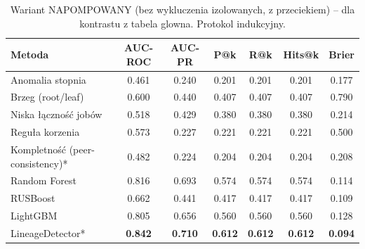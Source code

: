 \begin{table}[ht]
\centering
\caption{Wariant NAPOMPOWANY (bez wykluczenia izolowanych, z przeciekiem) -- dla kontrastu z tabela glowna. Protokol indukcyjny.}
\label{tab:wyniki-napompowany}
\begin{tabular}{lcccccc}
\toprule
\textbf{Metoda} & \textbf{AUC-ROC} & \textbf{AUC-PR} & \textbf{P@k} & \textbf{R@k} & \textbf{Hits@k} & \textbf{Brier} \\
\midrule
Anomalia stopnia & 0.461 & 0.240 & 0.201 & 0.201 & 0.201 & 0.177 \\
Brzeg (root/leaf) & 0.600 & 0.440 & 0.407 & 0.407 & 0.407 & 0.790 \\
Niska łączność jobów & 0.518 & 0.429 & 0.380 & 0.380 & 0.380 & 0.214 \\
Reguła korzenia & 0.573 & 0.227 & 0.221 & 0.221 & 0.221 & 0.500 \\
Kompletność (peer-consistency)* & 0.482 & 0.224 & 0.204 & 0.204 & 0.204 & 0.208 \\
\midrule
Random Forest & 0.816 & 0.693 & 0.574 & 0.574 & 0.574 & 0.114 \\
RUSBoost & 0.662 & 0.441 & 0.417 & 0.417 & 0.417 & 0.109 \\
LightGBM & 0.805 & 0.656 & 0.560 & 0.560 & 0.560 & 0.128 \\
\midrule
LineageDetector* & \textbf{0.842} & \textbf{0.710} & \textbf{0.612} & \textbf{0.612} & \textbf{0.612} & \textbf{0.094} \\
\bottomrule
\end{tabular}
\end{table}
